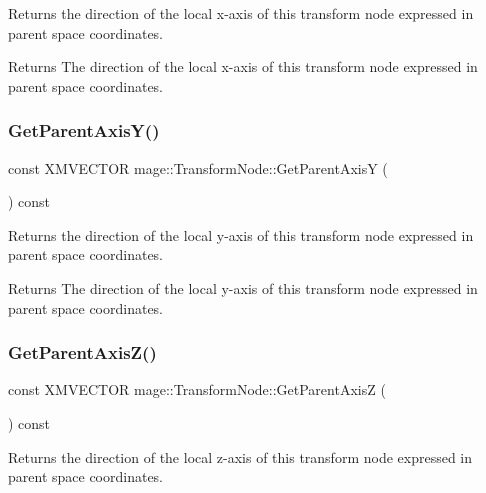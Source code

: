Returns the direction of the local x-\/axis of this transform node expressed in parent space coordinates.

\begin{DoxyReturn}{Returns}
The direction of the local x-\/axis of this transform node expressed in parent space coordinates. 
\end{DoxyReturn}
\hypertarget{classmage_1_1_transform_node_a67b78520c247ac38d853481e76e144c8}{}\label{classmage_1_1_transform_node_a67b78520c247ac38d853481e76e144c8} 
\subsubsection{\texorpdfstring{Get\+Parent\+Axis\+Y()}{GetParentAxisY()}}
{\footnotesize\ttfamily const X\+M\+V\+E\+C\+T\+OR mage\+::\+Transform\+Node\+::\+Get\+Parent\+AxisY (\begin{DoxyParamCaption}{ }\end{DoxyParamCaption}) const}

Returns the direction of the local y-\/axis of this transform node expressed in parent space coordinates.

\begin{DoxyReturn}{Returns}
The direction of the local y-\/axis of this transform node expressed in parent space coordinates. 
\end{DoxyReturn}
\hypertarget{classmage_1_1_transform_node_ae165746ea0907f39429608b06d4c57af}{}\label{classmage_1_1_transform_node_ae165746ea0907f39429608b06d4c57af} 
\subsubsection{\texorpdfstring{Get\+Parent\+Axis\+Z()}{GetParentAxisZ()}}
{\footnotesize\ttfamily const X\+M\+V\+E\+C\+T\+OR mage\+::\+Transform\+Node\+::\+Get\+Parent\+AxisZ (\begin{DoxyParamCaption}{ }\end{DoxyParamCaption}) const}

Returns the direction of the local z-\/axis of this transform node expressed in parent space coordinates.


